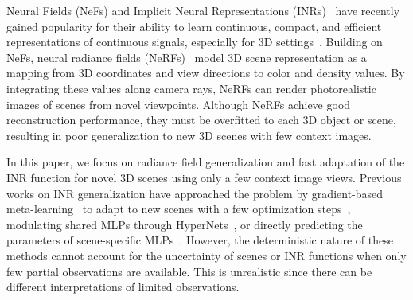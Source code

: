 

Neural Fields (NeFs) and Implicit Neural Representations (INRs)~\citep{sitzmann2020implicit,tancik2020fourier} have recently gained popularity for their ability to learn continuous, compact, and efficient representations of continuous signals, especially for 3D settings~\citep{park2019deepsdf,mildenhall2021nerf,mescheder2019occupancy,chen2022tensorf}. Building on NeFs, neural radiance fields (NeRFs)~\citep{mildenhall2021nerf,barron2021mip} model 3D scene representation as a mapping from 3D coordinates and view directions to color and density values. By integrating these values along camera rays, NeRFs can render photorealistic images of scenes from novel viewpoints. 
Although NeRFs achieve good reconstruction performance, they must be overfitted to each 3D object or scene, resulting in poor generalization to new 3D scenes with few context images.




In this paper, we focus on radiance field generalization and fast adaptation of the INR function for novel 3D scenes using only a few context image views. Previous works on INR generalization have approached the problem by gradient-based meta-learning~\citep{tancik2021learned} to adapt to new scenes with a few optimization steps~\citep{tancik2021learned,papa2023train}, 
modulating shared MLPs through HyperNets~\citep{chen2022transformers,mehta2021modulated,dupont2022data,kim2023generalizable}, or directly predicting the parameters of scene-specific MLPs~\citep{dupont2021generative,erkocc2023hyperdiffusion}. However, the deterministic nature of these methods cannot account for the uncertainty of scenes or INR functions when only few partial observations are available. This is unrealistic since there can be different interpretations of limited observations. 

